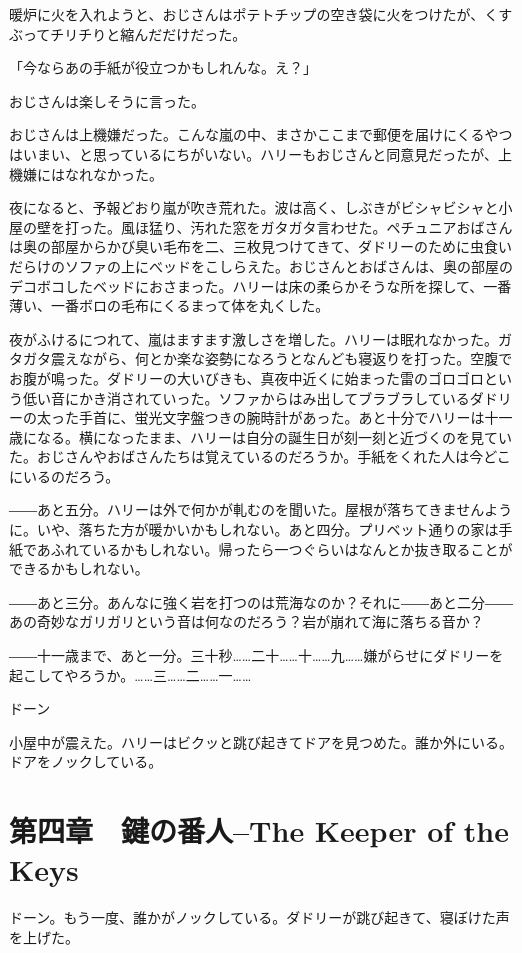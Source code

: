 \documentclass[10pt,a4paper]{article}
\begin{document}
\begin{CJK}{UTF8}{min}
暖炉に火を入れようと、おじさんはポテトチップの空き袋に火をつけたが、くすぶってチリチりと縮んだだけだった。

「今ならあの手紙が役立つかもしれんな。え？」

おじさんは楽しそうに言った。

おじさんは上機嫌だった。こんな嵐の中、まさかここまで郵便を届けにくるやつはいまい、と思っているにちがいない。ハリーもおじさんと同意見だったが、上機嫌にはなれなかった。

夜になると、予報どおり嵐が吹き荒れた。波は高く、しぶきがビシャビシャと小屋の壁を打った。風ほ猛り、汚れた窓をガタガタ言わせた。ペチュニアおばさんは奥の部屋からかび臭い毛布を二、三枚見つけてきて、ダドリーのために虫食いだらけのソファの上にべッドをこしらえた。おじさんとおばさんは、奥の部屋のデコボコしたベッドにおさまった。ハリーは床の柔らかそうな所を探して、一番薄い、一番ボロの毛布にくるまって体を丸くした。

夜がふけるにつれて、嵐はますます激しさを増した。ハリーは眠れなかった。ガタガタ震えながら、何とか楽な姿勢になろうとなんども寝返りを打った。空腹でお腹が鳴った。ダドリーの大いびきも、真夜中近くに始まった雷のゴロゴロという低い音にかき消されていった。ソファからはみ出してブラブラしているダドリーの太った手首に、蛍光文字盤つきの腕時計があった。あと十分でハリーは十一歳になる。横になったまま、ハリーは自分の誕生日が刻一刻と近づくのを見ていた。おじさんやおばさんたちは覚えているのだろうか。手紙をくれた人は今どこにいるのだろう。

――あと五分。ハリーは外で何かが軋むのを聞いた。屋根が落ちてきませんように。いや、落ちた方が暖かいかもしれない。あと四分。プリベット通りの家は手紙であふれているかもしれない。帰ったら一つぐらいはなんとか抜き取ることができるかもしれない。

――あと三分。あんなに強く岩を打つのは荒海なのか？それに――あと二分――あの奇妙なガリガリという音は何なのだろう？岩が崩れて海に落ちる音か？

――十一歳まで、あと一分。三十秒……二十……十……九……嫌がらせにダドリーを起こしてやろうか。……三……二……一……

ドーン

小屋中が震えた。ハリーはビクッと跳び起きてドアを見つめた。誰か外にいる。ドアをノックしている。



\section{第四章　鍵の番人--The Keeper of the Keys}


ドーン。もう一度、誰かがノックしている。ダドリーが跳び起きて、寝ぼけた声を上げた。


\end{CJK}
\end{document}
